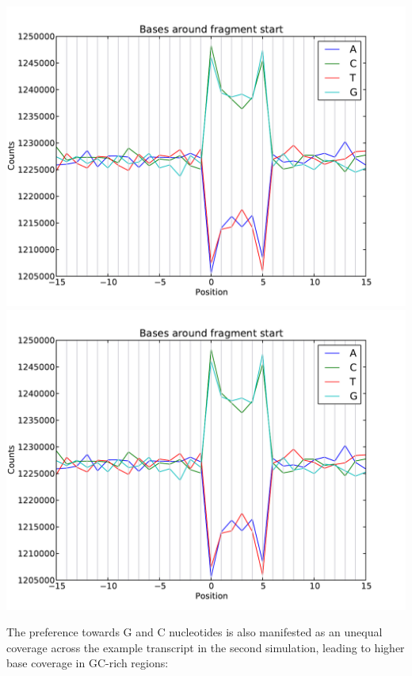 \begin{center}
\includegraphics[scale=0.6,page=1]{../src/test/pos_bias/pb_after_prim_double.pdf}
\\
\includegraphics[scale=0.6,page=2]{../src/test/pos_bias/pb_after_prim_double.pdf}
\end{center}

The preference towards G and C nucleotides is also manifested as an unequal coverage across the example transcript in the second simulation,
leading to higher base coverage in GC-rich regions:


